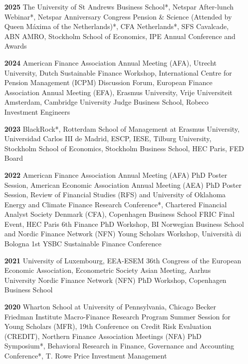 \documentclass[11pt]{res} %
\begin{document}
\begin{resume}
\begin{itemize}
\item[\textbf{2025}] The University of St Andrews Business School*, Netspar After-lunch Webinar*, Netspar Anniversary Congress Pension \& Science (Attended by Queen Máxima of the Netherlands)*, CFA Netherlands*, SFS Cavalcade, ABN AMRO, Stockholm School of Economics, IPE Annual Conference and Awards\\[-1ex] 

\item[\textbf{2024}] American Finance Association Annual Meeting (AFA), Utrecht University, Dutch Sustainable Finance Workshop, International Centre for Pension Management (ICPM)  Discussion Forum, European Finance Association Annual Meeting (EFA), Erasmus University, Vrije Universiteit Amsterdam, Cambridge University Judge Business School, Robeco Investment Engineers\\[-1ex] %

\item[\textbf{2023}] BlackRock*, Rotterdam School of Management at Erasmus University, Universidad Carlos III de Madrid, ESCP, IESE, Tilburg University, Stockholm School of Economics, Stockholm Business School, HEC Paris, FED Board\\[-1ex]

\item[\textbf{2022}]  American Finance Association Annual Meeting (AFA) PhD Poster Session, American Economic Association Annual Meeting (AEA) PhD Poster Session, Review of Financial Studies (RFS) and University of Oklahoma Energy and Climate Finance Research Conference*, Chartered Financial Analyst Society Denmark (CFA), Copenhagen Business School FRIC Final Event, HEC Paris 6th Finance PhD Workshop,  BI Norwegian Business School and Nordic Finance Network (NFN) Young Scholars Workshop, Università di Bologna 1st YSBC Sustainable Finance Conference\\[-1ex]

\item[\textbf{2021}]  University of Luxembourg, EEA-ESEM 36th Congress of the European Economic Association, Econometric Society Asian Meeting,  Aarhus University Nordic Finance Network (NFN) PhD Workshop, Copenhagen Business School\\[-1ex]

\item[\textbf{2020}]  Wharton School at University of Pennsylvania, Chicago Becker Friedman Institute Macro-Finance Research Program Summer Session for Young Scholars (MFR), 19th Conference on Credit Risk Evaluation (CREDIT), Northern Finance Association Meetings (NFA) PhD Symposium*, Behavioral Research in Finance, Governance and Accounting Conference*, T. Rowe Price Investment Management\\[-1ex]


\end{itemize}
\end{resume}
\end{document}
